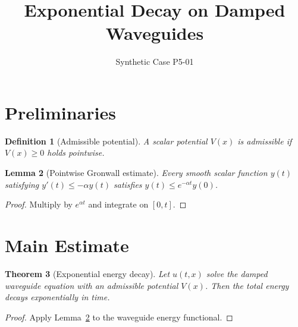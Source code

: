 \documentclass{article}
\title{Exponential Decay on Damped Waveguides}
\author{Synthetic Case P5-01}
\newtheorem{thm}{Theorem}[section]
\newtheorem{lem}[thm]{Lemma}
\newtheorem{defn}[thm]{Definition}
\begin{document}
\maketitle

\section{Preliminaries}
\label{sec:prelim}

\begin{defn}[Admissible potential]
\label{def:potential}
A scalar potential $V(x)$ is admissible if $V(x) \ge 0$ holds pointwise.
\end{defn}

\begin{lem}[Pointwise Gronwall estimate]
\label{lem:gronwall}
Every smooth scalar function $y(t)$ satisfying $y'(t) \le -\alpha y(t)$ satisfies $y(t) \le e^{-\alpha t} y(0)$.
\end{lem}

\begin{proof}
Multiply by $e^{\alpha t}$ and integrate on $[0, t]$.
\end{proof}

\section{Main Estimate}
\label{sec:main}

\begin{thm}[Exponential energy decay]
\label{thm:energy-decay}
Let $u(t,x)$ solve the damped waveguide equation with an admissible potential $V(x)$.
Then the total energy decays exponentially in time.
\end{thm}

\begin{proof}
Apply Lemma~\ref{lem:gronwall} to the waveguide energy functional.
\end{proof}
\end{document}
